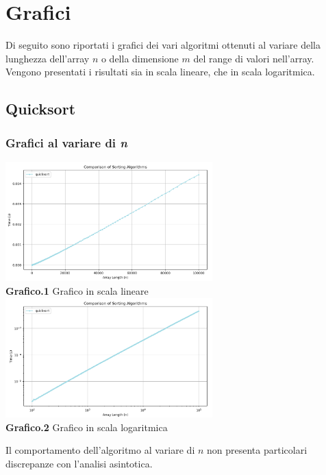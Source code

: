 \documentclass{article}
\begin{document}
\section{Grafici}
    Di seguito sono riportati i grafici dei vari algoritmi ottenuti al variare della lunghezza dell'array $n$ o della dimensione $m$ del range di valori nell'array. Vengono presentati i risultati sia in scala lineare, che in scala logaritmica.
    
    \subsection{Quicksort}
        \subsubsection{Grafici al variare di \textit{n}}
            \begin{center}
                \includegraphics[width=0.6\textwidth]{Quicksort.png} \\
                \textbf{Grafico.1} Grafico in scala lineare\\
                \vspace{0.5cm}
                \includegraphics[width=0.6\textwidth]{Quicksort_Log.png} \\
                \textbf{Grafico.2} Grafico in scala logaritmica\\
            \end{center}
            Il comportamento dell'algoritmo al variare di $n$ non presenta particolari discrepanze con l'analisi asintotica.
\end{document}
